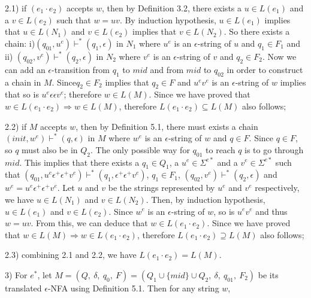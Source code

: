 \documentclass[twoside,openright,final]{bhamthesis}
\begin{document}
\par 2.1) if \((e_1 \cdot e_2)\) accepts \(w\), then by Definition
3.2, there exists a \(u \in L(e_1)\) and a \(v \in L(e_2)\) such that \(w
= uv\). By induction hypothesis, \(u \in L(e_1)\) implies that \(u \in
L(N_1)\) and \(v \in L(e_2)\) implies that \(v \in L(N_2)\). So there
exists a chain: i)\((q_{01} ,
u^e) \vdash^* (q_1 , \epsilon)\) in \(N_1\) where
\(u^e\) is an \(\epsilon\)-string of \(u\) and \(q_1 \in F_1\) and
ii) \((q_{02} , v^e) \vdash^* (q_2 , \epsilon)\) in \(N_2\)
where \(v^e\) is an \(\epsilon\)-string of \(v\) and \(q_2 \in
F_2\). Now we can add an \(\epsilon\)-transition from \(q_1\) to \(mid\) and
from \(mid\) to \(q_{02}\) in order to construct a chain in
\(M\). Since\(q_2
\in F_2\) implies that \(q_2 \in F\) and \(u^ev^e\) is an
\(\epsilon\)-string of \(w\) implies that so is \(u^e\epsilon \epsilon
v^e\); therefore \(w \in L(M)\). Since we have proved that \(w \in
L(e_1 \cdot e_2) \Rightarrow w \in L(M)\), therefore \(L(e_1 \cdot
e_2) \subseteq L(M)\) also follows;

\par 2.2) if \(M\) accepts \(w\), then by Definition 5.1, there must exists
a chain \((init , w^e) \vdash^* (q , \epsilon)\) in \(M\) where
\(w^e\) is an \(\epsilon\)-string of \(w\) and \(q \in F\). Since \(q
\in F\), so \(q\) must also be in \(Q_2\). The only possible way for
\(q_{01}\) to reach \(q\) is to go through \(mid\). This implies that
there exists a \(q_1 \in Q_1\), a \(u^e \in \Sigma^{e*}\) and a \(v^e \in
\Sigma^{e*}\) such that \((q_{01} , u^e\epsilon^+ \epsilon^+ v^e) \vdash^*
(q_1 , \epsilon^+ \epsilon^+ v^e)\), \(q_1 \in F_1\), \((q_{02} , v^e)
\vdash^* (q_2 , \epsilon)\) and \(w^e = u^e\epsilon^+ \epsilon^+
v^e\). Let \(u\) and \(v\) be the strings represented by \(u^e\) and
\(v^e\) respectively, we have \(u \in L(N_1)\) and \(v \in
L(N_2)\). Then, by induction hypothesis, \(u \in L(e_1)\) and \(v \in
L(e_2)\). Since \(w^e\) is an \(\epsilon\)-string of \(w\), so is
\(u^ev^e\) and thus \(w =
uv\). From this, we can deduce that \(w \in L(e_1 \cdot e_2)\). Since
we have proved that \(w \in L(M) \Rightarrow w \in L(e_1 \cdot e_2)\),
therefore \(L(e_1 \cdot e_2) \supseteq L(M)\) also follows;

\par 2.3) combining 2.1 and 2.2, we have \(L(e_1 \cdot e_2) = L(M)\). 
\\
\par 3) For \(e^*\), let \(M = (Q,\ \delta,\ q_0,\ F) = (Q_1 \cup \{mid\} \cup Q_2,\ \delta,\ q_{01},\ F_2)\) be its
translated \(\epsilon\)-NFA using Definition 5.1. Then for any string
\(w\), 
\end{document}
